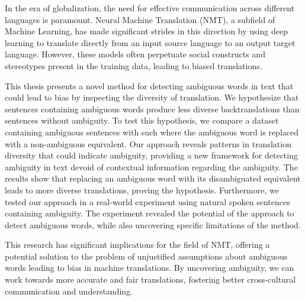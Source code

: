 \Abstract

In the era of globalization, the need for effective communication across different languages is paramount. Neural Machine Translation (NMT), a subfield of Machine Learning, has made significant strides in this direction by using deep learning to translate directly from an input source language to an output target language. 
However, these models often perpetuate social constructs and stereotypes present in the training data, leading to biased translations.

This thesis presents a novel method for detecting ambiguous words in text that could lead to bias by inspecting the diversity of translation. We hypothesize that sentences containing ambiguous words produce less diverse backtranslations than sentences without ambiguity. To test this hypothesis, we compare a dataset containing ambiguous sentences with such where the ambiguous word is replaced with a non-ambiguous equivalent.
Our approach reveals patterns in translation diversity that could indicate ambiguity, providing a new framework for detecting ambiguity in text devoid of contextual information regarding the ambiguity. The results show that replacing an ambiguous word with its disambiguated equivalent leads to more diverse translations, proving the hypothesis. 
Furthermore, we tested our approach in a real-world experiment using natural spoken sentences containing ambiguity. The experiment revealed the potential of the approach to detect ambiguous words, while also uncovering specific limitations of the method.

This research has significant implications for the field of NMT, offering a potential solution to the problem of unjustified assumptions about ambiguous words leading to bias in machine translations. By uncovering ambiguity, we can work towards more accurate and fair translations, fostering better cross-cultural communication and understanding.

